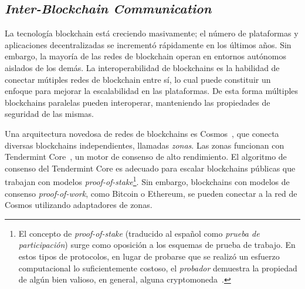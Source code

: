 
\subsection{\emph{Inter-Blockchain Communication}}
La tecnología blockchain está creciendo masivamente; el número de plataformas y
aplicaciones decentralizadas se incrementó rápidamente en los últimos años.
%
Sin embargo, la mayoría de las redes de blockchain operan en entornos autónomos aislados
de los demás.
%
La interoperabilidad de blockchains es la habilidad de conectar mútiples redes de
blockchain entre sí, lo cual puede constituir un enfoque para mejorar la escalabilidad en
las plataformas.
%
De esta forma múltiples blockchains paralelas pueden interoperar, manteniendo las
propiedades de seguridad de las mismas.

Una arquitectura novedosa de redes de blockchains es Cosmos~\cite{cosmos}, que conecta diversas
blockchains independientes, llamadas \emph{zonas}.
%
Las zonas funcionan con Tendermint Core~\cite{Buchman.2018.Tendermint}, un motor de consenso de alto rendimiento.
%
El algoritmo de consenso del Tendermint Core es adecuado para escalar blockchains públicas que
trabajan con modelos \emph{proof-of-stake}\footnote{El concepto de \emph{proof-of-stake} (traducido al español
como \emph{prueba de participación}) surge como oposición a los esquemas de prueba de trabajo.
En estos tipos de protocolos, en lugar de probarse que se realizó un esfuerzo computacional lo suficientemente
costoso, el \emph{probador} demuestra la propiedad de algún bien valioso, en general, alguna cryptomoneda~\cite{King2012PPCoinPC}.}.
%
Sin embargo, blockchains con modelos de consenso \emph{proof-of-work}, como Bitcoin o Ethereum,
se pueden conectar a la red de Cosmos utilizando adaptadores de zonas.

